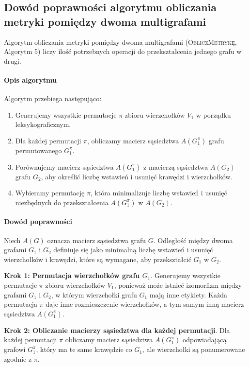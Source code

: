 \subsection{Dowód poprawności algorytmu obliczania metryki pomiędzy dwoma multigrafami}

Algorytm obliczania metryki pomiędzy dwoma multigrafami (\textsc{ObliczMetrykę}, Algorytm 5) liczy ilość potrzebnych operacji do przekształcenia jednego grafu w drugi.

\paragraph{Opis algorytmu}
Algorytm przebiega następująco:
\begin{enumerate}
    \item Generujemy wszystkie permutacje \( \pi \) zbioru wierzchołków \( V_1 \) w porządku leksykograficznym.
    \item Dla każdej permutacji \( \pi \), obliczamy macierz sąsiedztwa \( A(G_1^\pi) \) grafu permutowanego \( G_1^\pi \).
    \item Porównujemy macierz sąsiedztwa \( A(G_1^\pi) \) z macierzą sąsiedztwa \( A(G_2) \) grafu \( G_2 \), aby określić liczbę wstawień i usunięć krawędzi i wierzchołków.
    \item Wybieramy permutację \( \pi \), która minimalizuje liczbę wstawień i usunięć niezbędnych do przekształcenia \( A(G_1^\pi) \) w \( A(G_2) \).
\end{enumerate}

\paragraph{Dowód poprawności}

Niech \( A(G) \) oznacza macierz sąsiedztwa grafu \( G \). Odległość między dwoma grafami \( G_1 \) i \( G_2 \) definiuje się jako minimalną liczbę wstawień i usunięć wierzchołków i krawędzi, które są wymagane, aby przekształcić \( G_1 \) w \( G_2 \).

\textbf{Krok 1: Permutacja wierzchołków grafu \( G_1 \)}.
Generujemy wszystkie permutacje \( \pi \) zbioru wierzchołków \( V_1 \), ponieważ może istnieć izomorfizm między grafami \( G_1 \) i \( G_2 \), w którym wierzchołki grafu \( G_1 \) mają inne etykiety. Każda permutacja \( \pi \) daje inne rozmieszczenie wierzchołków, a tym samym inną macierz sąsiedztwa \( A(G_1^\pi) \).

\textbf{Krok 2: Obliczanie macierzy sąsiedztwa dla każdej permutacji}.
Dla każdej permutacji \( \pi \) obliczamy macierz sąsiedztwa \( A(G_1^\pi) \) odpowiadającą grafowi \( G_1^\pi \), który ma te same krawędzie co \( G_1 \), ale wierzchołki są ponumerowane zgodnie z \( \pi \).

